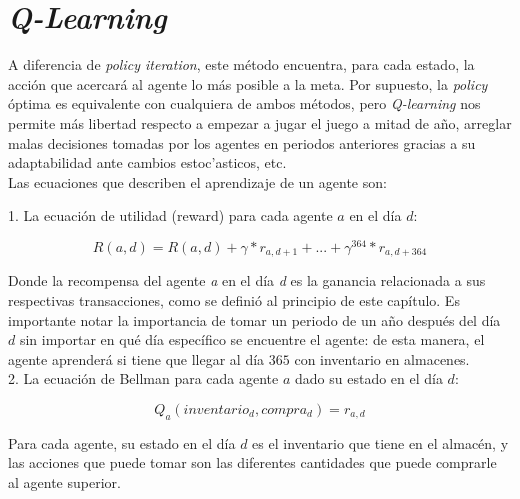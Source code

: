 \section{\textit{Q-Learning}}

A diferencia de \textit{policy iteration}, este m\'etodo encuentra, para cada estado, la acci\'on que acercar\'a al agente lo m\'as posible a la meta. Por supuesto, la \textit{policy} \'optima es equivalente con cualquiera de ambos m\'etodos, pero \textit{Q-learning} nos permite m\'as libertad respecto a empezar a jugar el juego a mitad de a\~no, arreglar malas decisiones tomadas por los agentes en periodos anteriores gracias a su adaptabilidad ante cambios estoc'asticos, etc.\\

Las ecuaciones que describen el aprendizaje de un agente son:

1. La ecuaci\'on de utilidad (reward) para cada agente $a$ en el d\'ia $d$:

$$
R(a, d) = R(a,d) + \gamma*r_{a, d+1} + ... + \gamma^{364}*r_{a,d+364}
$$

Donde la recompensa del agente \textit{a} en el d\'ia \textit{d} es la ganancia relacionada a sus respectivas transacciones, como se defini\'o al principio de este cap\'itulo. Es importante notar la importancia de tomar un periodo de un a\~no despu\'es del d\'ia $d$ sin importar en qu\'e d\'ia espec\'ifico se encuentre el agente: de esta manera, el agente aprender\'a si tiene que llegar al d\'ia $365$ con inventario en almacenes.\\

2. La ecuaci\'on de Bellman para cada agente $a$ dado su estado en el d\'ia $d$:

$$
Q_{a}(inventario_{d},compra_{d}) = r_{a, d}
$$

Para cada agente, su estado en el d\'ia $d$ es el inventario que tiene en el almac\'en, y las acciones que puede tomar son las diferentes cantidades que puede comprarle al agente superior. 

